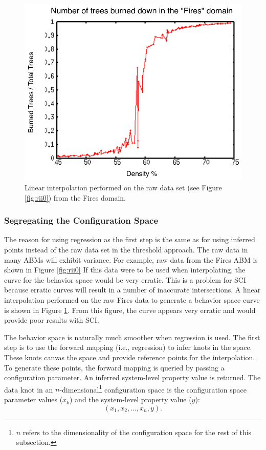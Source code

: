 \begin{figure}[ht]
\centering
\includegraphics[scale=.66666667]{images/rii1.pdf}
\caption{Linear interpolation performed on the raw data set (see Figure \ref{fig:rii0}) from the Fires domain.}
\label{fig:rii1}
\end{figure}

\subsubsection{Segregating the Configuration Space}
The reason for using regression as the first step is the same as for using inferred points instead of the raw data set in the threshold approach.
The raw data in many ABMs will exhibit variance.
For example, raw data from the Fires ABM is shown in Figure \ref{fig:rii0}
If this data were to be used when interpolating, the curve for the behavior space would be very erratic.
This is a problem for SCI because erratic curves will result in a number of inaccurate intersections.
A linear interpolation performed on the raw Fires data to generate a behavior space curve is shown in Figure \ref{fig:rii1}.
From this figure, the curve appears very erratic and would provide poor results with SCI.


The behavior space is naturally much smoother when regression is used.
The first step is to use the forward mapping (i.e., regression) to infer knots in the space.
These knots canvas the space and provide reference points for the interpolation.
To generate these points, the forward mapping is queried by passing a configuration parameter.
An inferred system-level property value is returned.
The data knot in an $n$-dimensional\footnote{$n$ refers to the dimensionality of the configuration space for the rest of this subsection.}  configuration space is the configuration space parameter values ($x_k$) and the system-level property value ($y$):
\[(x_1, x_2, ..., x_n, y).\]

